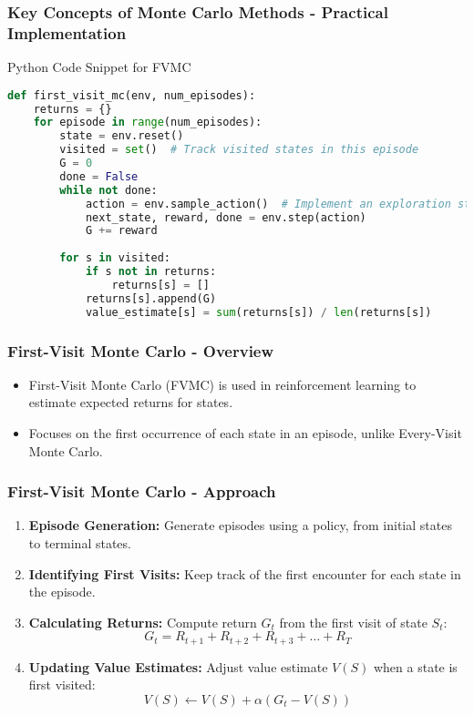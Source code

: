 \documentclass[aspectratio=169]{beamer}
\begin{document}
\begin{frame}[fragile]
    \frametitle{Key Concepts of Monte Carlo Methods - Practical Implementation}
    \begin{block}{Python Code Snippet for FVMC}
    \begin{lstlisting}[language=Python]
def first_visit_mc(env, num_episodes):
    returns = {}
    for episode in range(num_episodes):
        state = env.reset()
        visited = set()  # Track visited states in this episode
        G = 0
        done = False
        while not done:
            action = env.sample_action()  # Implement an exploration strategy
            next_state, reward, done = env.step(action)
            G += reward
        
        for s in visited:
            if s not in returns:
                returns[s] = []
            returns[s].append(G)
            value_estimate[s] = sum(returns[s]) / len(returns[s])
    \end{lstlisting}
    \end{block}
\end{frame}

\begin{frame}[fragile]
    \frametitle{First-Visit Monte Carlo - Overview}
    \begin{itemize}
        \item First-Visit Monte Carlo (FVMC) is used in reinforcement learning to estimate expected returns for states.
        \item Focuses on the first occurrence of each state in an episode, unlike Every-Visit Monte Carlo.
    \end{itemize}
\end{frame}

\begin{frame}[fragile]
    \frametitle{First-Visit Monte Carlo - Approach}
    \begin{enumerate}
        \item \textbf{Episode Generation:} Generate episodes using a policy, from initial states to terminal states.
        
        \item \textbf{Identifying First Visits:} Keep track of the first encounter for each state in the episode.
        
        \item \textbf{Calculating Returns:} Compute return \( G_t \) from the first visit of state \( S_t \):
        \begin{equation}
            G_t = R_{t+1} + R_{t+2} + R_{t+3} + \ldots + R_T
        \end{equation}

        \item \textbf{Updating Value Estimates:} Adjust value estimate \( V(S) \) when a state is first visited:
        \begin{equation}
            V(S) \leftarrow V(S) + \alpha (G_t - V(S))
        \end{equation}
    \end{enumerate}
\end{frame}
\end{document}
